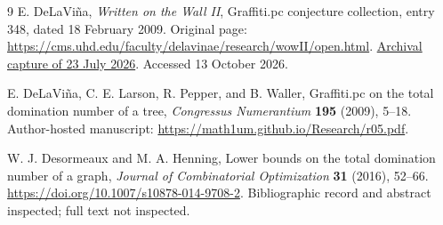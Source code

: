 \documentclass[11pt,a4paper]{article}
\theoremstyle{remark}
\begin{document}
\begin{thebibliography}{9}
E. DeLaVi\~na,
\emph{Written on the Wall II}, Graffiti.pc conjecture collection,
entry 348, dated 18 February 2009.
Original page:
\url{https://cms.uhd.edu/faculty/delavinae/research/wowII/open.html}.
\href{https://web.archive.org/web/20260723211215id_/http://cms.uhd.edu/faculty/delavinae/research/wowII/open.html}{Archival capture of 23 July 2026}.
Accessed 13 October 2026.

E. DeLaVi\~na, C. E. Larson, R. Pepper, and B. Waller,
Graffiti.pc on the total domination number of a tree,
\emph{Congressus Numerantium} \textbf{195} (2009), 5--18.
Author-hosted manuscript: \url{https://math1um.github.io/Research/r05.pdf}.

W. J. Desormeaux and M. A. Henning,
Lower bounds on the total domination number of a graph,
\emph{Journal of Combinatorial Optimization} \textbf{31} (2016), 52--66.
\url{https://doi.org/10.1007/s10878-014-9708-2}.
Bibliographic record and abstract inspected; full text not inspected.
\end{thebibliography}
\end{document}
